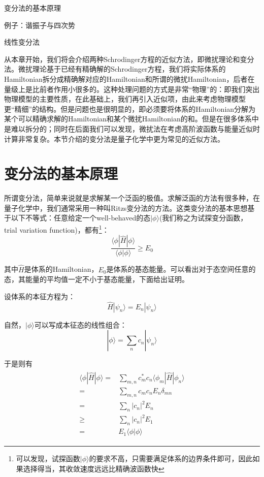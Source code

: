 \begin{introduction}
    \item 变分法的基本原理
    \item 例子：谐振子与四次势
    \item 线性变分法
\end{introduction}
从本章开始，我们将会介绍两种Schrodinger方程的近似方法，即微扰理论和变分法。微扰理论基于已经有精确解的Schrodinger方程，我们将实际体系的Hamiltonian拆分成精确解对应的Hamiltonian和所谓的微扰Hamiltonian，后者在量级上是比前者作用小很多的。这种处理问题的方式是非常“物理”的：即我们突出物理模型的主要性质，在此基础上，我们再引入近似项，由此来考虑物理模型更“精细”的结构。但是问题也是很明显的，即必须要将体系的Hamiltonian分解为某个可以精确求解的Hamiltonian和某个微扰Hamiltonian的和。但是在很多体系中是难以拆分的；同时在后面我们可以发现，微扰法在考虑高阶波函数与能量近似时计算非常复杂。本节介绍的变分法是量子化学中更为常见的近似方法。
\section{变分法的基本原理}
所谓变分法，简单来说就是求解某一个泛函的极值。求解泛函的方法有很多种，在量子化学中，我们通常采用一种叫Ritzs变分法的方法。这类变分法的基本思想基于以下不等式：任意给定一个well-behaved的态$|\phi\rangle$(我们称之为试探变分函数，trial variation function)，都有\footnote{可以发现，试探函数$|\phi\rangle$的要求不高，只需要满足体系的边界条件即可，因此如果选择得当，其收敛速度远远比精确波函数快}：
\begin{equation}\label{equ9:variationequ}
    \frac{\langle \phi|\hat{H}|\phi\rangle}{\langle \phi|\phi\rangle}\geq E_0
\end{equation}

其中$\hat{H}$是体系的Hamiltonian，$E_0$是体系的基态能量。可以看出对于态空间任意的态，其能量的平均值一定不小于基态能量，下面给出证明。

设体系的本征方程为：
\begin{equation}
    \hat{H}|\psi_n\rangle=E_n|\psi_n\rangle
\end{equation}

自然，$|\phi\rangle$可以写成本征态的线性组合：
\begin{equation}
    |\phi\rangle=\sum_n c_n|\psi_n\rangle
\end{equation}

于是则有
\begin{align}
    \begin{split}
        \langle \phi|\hat{H}|\phi\rangle=&\sum_{m,n}c_m^*c_n\langle\phi_m|\hat{H}|\phi_n\rangle\\
        =& \sum_{m,n}c_mc_n E_n \delta_{mn}\\
        =& \sum_n |c_n|^2 E_n \\
        \geq& \sum_n |c_n|^2 E_1 \\
        =& E_1\langle \phi|\phi\rangle
    \end{split}
\end{align}

